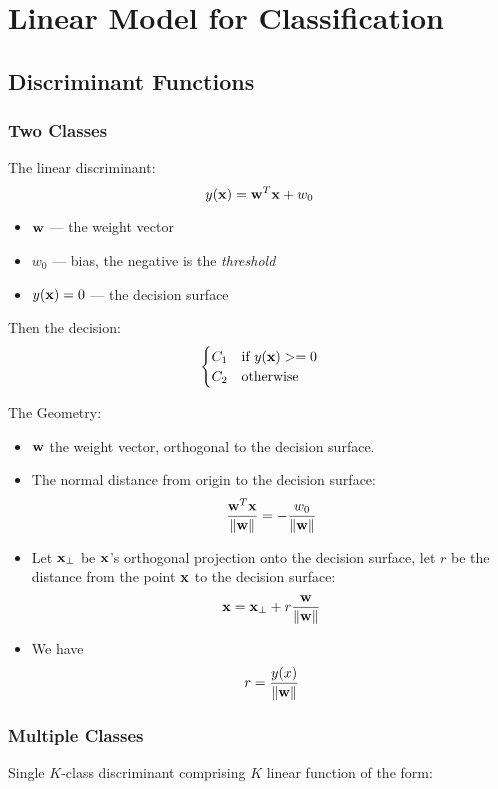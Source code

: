 \chapter{Linear Model for Classification}

\section{Discriminant Functions}
\subsection{Two Classes}
The linear discriminant:
\begin{equation}
    y(\mathbf{x}) = \mathbf{w}^T\mathbf{x} + w_0
    \label{linear_dis}
\end{equation}

\begin{itemize}
    \item $\mathbf{w}$ --- the weight vector
    \item $w_0$ --- bias, the negative is the \emph{threshold}
    \item $y(\mathbf{x}) = 0$ --- the decision surface
\end{itemize}

Then the decision:
\begin{equation}
    \begin{cases}
        C_1 & \text{if } y(\mathbf{x}) >= 0\\
        C_2 & \text{otherwise}
    \end{cases}
\end{equation}

The Geometry:
\begin{itemize}
    \item $\mathbf{w}$ the weight vector, orthogonal to the decision surface.
    \item The normal distance from origin to the decision surface:
        \begin{equation}
            \frac{\mathbf{w}^T \mathbf{x}}{\|\mathbf{w}\|} = -\frac{w_0}{\|\mathbf{w}\|}
        \end{equation}
    \item Let $\mathbf{x}_{\perp}$ be $\mathbf{x}$'s orthogonal projection onto the
        decision surface, let $r$ be the distance from the point $\mathbf{x}$ to
        the decision surface:
        \begin{equation}
            \mathbf{x} = \mathbf{x}_{\perp} + r \frac{\mathbf{w}}{\|\mathbf{w}\|}
        \end{equation}
    \item We have
        \begin{equation}
            r = \frac{y(x)}{\|\mathbf{w}\|}
        \end{equation}
\end{itemize}
\subsection{Multiple Classes}
Single $K$-class discriminant comprising $K$ linear function of the form:

